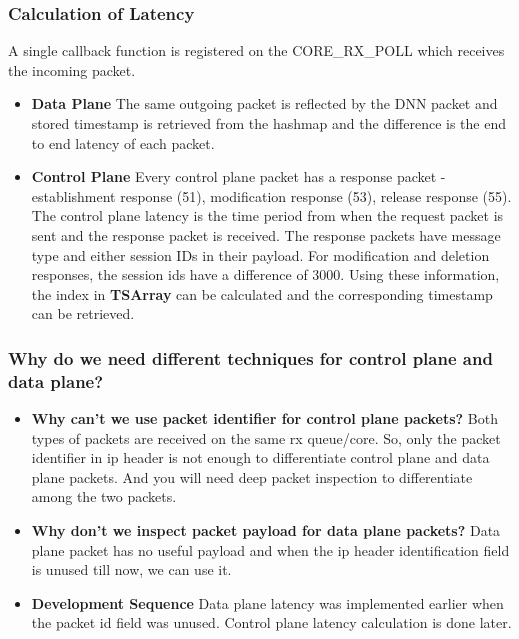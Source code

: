 \subsubsection{Calculation of Latency}
A single callback function is registered on the CORE\_RX\_POLL which  receives the incoming packet.
\begin{itemize}
	\item \textbf{Data Plane} The same outgoing packet is reflected by the DNN packet and stored timestamp is retrieved from the hashmap and the difference is the end to end latency of each packet.
	\item \textbf{Control Plane} Every control plane packet has a response packet - establishment response (51), modification response (53), release response (55). The control plane latency is the time period from when the request packet is sent and the response packet is received.
	      The response packets have message type and either session IDs in their payload. For
	      modification and deletion  responses, the session ids have a difference of 3000.  Using these information, the index in \textbf{TSArray} can be calculated and the corresponding timestamp can be retrieved.
\end{itemize}
\subsubsection{Why do we need different techniques for control plane and data plane?}
\begin{itemize}
	\item \textbf{Why can't we use packet identifier for control plane packets?}
	      Both types of packets are received on the same rx queue/core. So, only the packet identifier in ip header is not enough to differentiate control plane and data plane packets. And you will need deep packet inspection to differentiate among the two packets.
	\item \textbf{Why don't we inspect packet payload for data plane packets?} Data plane packet has no useful payload and when the ip header identification field is unused till now, we can use it.
	\item \textbf{Development Sequence}
	      Data plane latency was implemented earlier when the packet id field was unused. Control plane latency calculation is done later.
\end{itemize}

